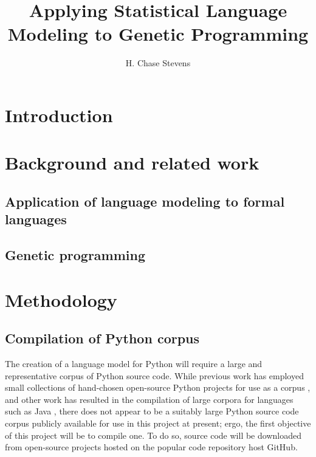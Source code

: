 \documentclass[a4paper,11pt]{proposal}
\title{Applying Statistical Language Modeling to Genetic Programming}
\author{H. Chase Stevens}
\begin{document}
\maketitle 
\parindent=0mm


\setcounter{tocdepth}{2}

\clearpage

\newpage


\setlength{\parskip}{1ex} 


\section{Introduction} \label{sec:intro}

\section{Background and related work} \label{sec:back}

\subsection{Application of language modeling to formal languages}

\subsection{Genetic programming}

\section{Methodology} \label{sec:disc}

\subsection{Compilation of Python corpus}
The creation of a language model for Python will require a large and representative corpus of Python source code. While previous work has employed small collections of hand-chosen open-source Python projects for use as a corpus \cite{tu2014} \cite{caliskan2015}, and other work has resulted in the compilation of large corpora for languages such as Java \cite{allamanis2013}, there does not appear to be a suitably large Python source code corpus publicly available for use in this project at present; ergo, the first objective of this project will be to compile one. To do so, source code will be downloaded from open-source projects hosted on the popular code repository host GitHub. 
\end{document}
